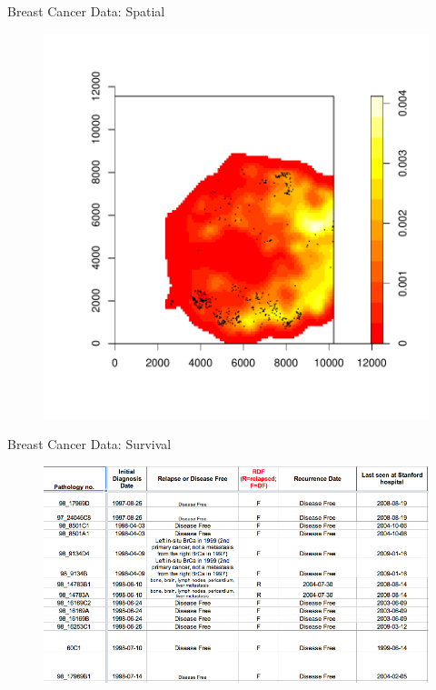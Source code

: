 \documentclass{beamer}
\begin{document}
\begin{frame}{Breast Cancer Data: Spatial}
  \begin{figure}
    \centering
    \includegraphics[scale=.5]{Fig2healthyDC.pdf}
  \end{figure}
\end{frame}

\begin{frame}{Breast Cancer Data: Survival}
  \begin{figure}
    \centering
    \includegraphics[scale=.5]{survival.png}
  \end{figure}
\end{frame}
\end{document}
